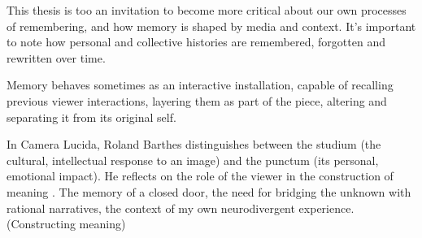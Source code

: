This thesis is too an invitation to become more critical about our own processes of remembering, and how memory is shaped by media and context. It's important to note how personal and collective histories are remembered, forgotten and rewritten over time.

Memory behaves sometimes as an interactive installation, capable of recalling previous viewer interactions, layering them as part of the piece, altering and separating it from its original self. 

In Camera Lucida, Roland Barthes distinguishes between the studium (the cultural, intellectual response to an image) and the punctum (its personal, emotional impact). He reflects on the role of the viewer in the construction of meaning \citep{barthes1993}. The memory of a closed door, the need for bridging the unknown with rational narratives, the context of my own neurodivergent experience. (Constructing meaning)  







